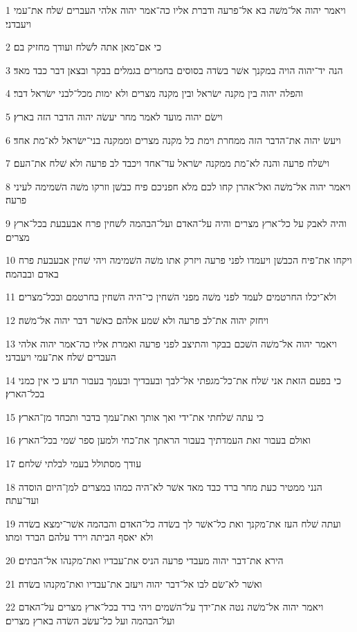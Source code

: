 \par 1 ויאמר יהוה אל־משׁה בא אל־פרעה ודברת אליו כה־אמר יהוה אלהי העברים שׁלח את־עמי ויעבדני׃
\par 2 כי אם־מאן אתה לשׁלח ועודך מחזיק בם׃
\par 3 הנה יד־יהוה הויה במקנך אשׁר בשׂדה בסוסים בחמרים בגמלים בבקר ובצאן דבר כבד מאד׃
\par 4 והפלה יהוה בין מקנה ישׂראל ובין מקנה מצרים ולא ימות מכל־לבני ישׂראל דבר׃
\par 5 וישׂם יהוה מועד לאמר מחר יעשׂה יהוה הדבר הזה בארץ׃
\par 6 ויעשׂ יהוה את־הדבר הזה ממחרת וימת כל מקנה מצרים וממקנה בני־ישׂראל לא־מת אחד׃
\par 7 וישׁלח פרעה והנה לא־מת ממקנה ישׂראל עד־אחד ויכבד לב פרעה ולא שׁלח את־העם׃
\par 8 ויאמר יהוה אל־משׁה ואל־אהרן קחו לכם מלא חפניכם פיח כבשׁן וזרקו משׁה השׁמימה לעיני פרעה׃
\par 9 והיה לאבק על כל־ארץ מצרים והיה על־האדם ועל־הבהמה לשׁחין פרח אבעבעת בכל־ארץ מצרים׃
\par 10 ויקחו את־פיח הכבשׁן ויעמדו לפני פרעה ויזרק אתו משׁה השׁמימה ויהי שׁחין אבעבעת פרח באדם ובבהמה׃
\par 11 ולא־יכלו החרטמים לעמד לפני משׁה מפני השׁחין כי־היה השׁחין בחרטמם ובכל־מצרים׃
\par 12 ויחזק יהוה את־לב פרעה ולא שׁמע אלהם כאשׁר דבר יהוה אל־משׁה׃
\par 13 ויאמר יהוה אל־משׁה השׁכם בבקר והתיצב לפני פרעה ואמרת אליו כה־אמר יהוה אלהי העברים שׁלח את־עמי ויעבדני׃
\par 14 כי בפעם הזאת אני שׁלח את־כל־מגפתי אל־לבך ובעבדיך ובעמך בעבור תדע כי אין כמני בכל־הארץ׃
\par 15 כי עתה שׁלחתי את־ידי ואך אותך ואת־עמך בדבר ותכחד מן־הארץ׃
\par 16 ואולם בעבור זאת העמדתיך בעבור הראתך את־כחי ולמען ספר שׁמי בכל־הארץ׃
\par 17 עודך מסתולל בעמי לבלתי שׁלחם׃
\par 18 הנני ממטיר כעת מחר ברד כבד מאד אשׁר לא־היה כמהו במצרים למן־היום הוסדה ועד־עתה׃
\par 19 ועתה שׁלח העז את־מקנך ואת כל־אשׁר לך בשׂדה כל־האדם והבהמה אשׁר־ימצא בשׂדה ולא יאסף הביתה וירד עלהם הברד ומתו׃
\par 20 הירא את־דבר יהוה מעבדי פרעה הניס את־עבדיו ואת־מקנהו אל־הבתים׃
\par 21 ואשׁר לא־שׂם לבו אל־דבר יהוה ויעזב את־עבדיו ואת־מקנהו בשׂדה׃
\par 22 ויאמר יהוה אל־משׁה נטה את־ידך על־השׁמים ויהי ברד בכל־ארץ מצרים על־האדם ועל־הבהמה ועל כל־עשׂב השׂדה בארץ מצרים׃
